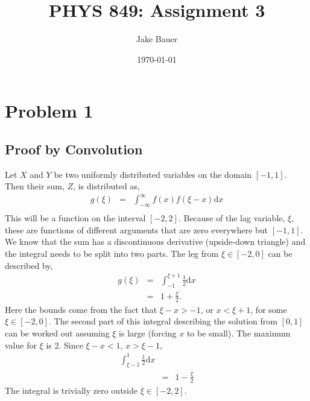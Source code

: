 \documentclass[12pt]{article}
\begin{document}
\title{PHYS 849: Assignment 3}
\author{Jake Bauer}
\date{\today}
\maketitle


\section*{Problem 1}
\subsection*{Proof by Convolution}
Let $X$ and $Y$ be two uniformly distributed variables on the domain $[-1,1]$.  Then their sum, $Z$, is distributed as,
\begin{eqnarray}
g(\xi) &=& \int_{-\infty}^\infty f(x) f(\xi - x) \text{d} x\\
\end{eqnarray}
This will be a function on the interval $[-2,2]$.  Because of the lag variable, $\xi$, these are functions of different arguments that are zero everywhere but $[-1,1]$.  We know that the sum has a discontinuous derivative (upside-down triangle) and the integral needs to be split into two parts.  The leg from $\xi \in [-2,0]$ can be described by,
\begin{eqnarray}
g(\xi) &=& \int_{-1}^{\xi + 1} \frac{1}{2} \text{d} x\\
&=& 1 + \frac{\xi}{2}.
\end{eqnarray}
Here the bounds come from the fact that $\xi - x > -1$, or $x < \xi + 1$, for some $\xi \in [-2,0]$. The second part of this integral describing the solution  from $[0,1]$ can be worked out assuming $\xi$ is large (forcing $x$ to be small).  The maximum value for $\xi$ is 2.  Since $\xi - x < 1$, $x > \xi - 1$,
\begin{eqnarray}
\int_{\xi - 1}^{1} \frac{1}{2} \text{d} x\\
&=& 1 - \frac{\xi}{2}
\end{eqnarray}
The integral is trivially zero outside $\xi \in [-2,2]$.
\end{document}

